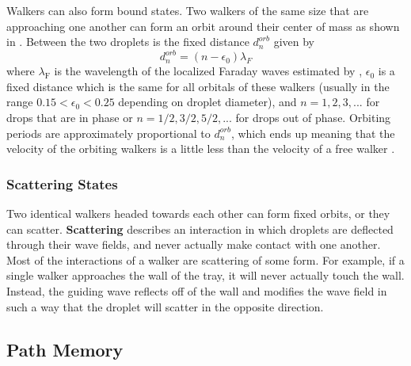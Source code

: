             Walkers can also form bound states. Two walkers of the same size that are approaching one another can form an orbit around their center of mass as shown in . Between the two droplets is the fixed distance $d_{n}^{orb}$ given by          
\begin{equation} \label{orbital}
d_{n}^{orb} = (n - \epsilon_0)\lambda_F
\end{equation}         
where $\lambda_\mathrm{F}$ is the wavelength of the localized Faraday waves estimated by , $\epsilon_0$ is a fixed distance which is the same for all orbitals of these walkers (usually in the range $0.15 < \epsilon_0 < 0.25$ depending on droplet diameter), and $n = 1,2,3,...$ for drops that are in phase or $n = 1/2, 3/2, 5/2,...$ for drops out of phase. Orbiting periods are approximately proportional to $d_{n}^{orb}$, which ends up meaning that the velocity of the orbiting walkers is a little less than the velocity of a free walker . 


            \subsubsection{Scattering States}
            Two identical walkers headed towards each other can form fixed orbits, or they can scatter. \textbf{Scattering} describes an interaction in which droplets are deflected through their wave fields, and never actually make contact with one another. Most of the interactions of a walker are scattering of some form. For example, if a single walker approaches the wall of the tray, it will never actually touch the wall. Instead, the guiding wave reflects off of the wall and modifies the wave field in such a way that the droplet will scatter in the opposite direction.           





 
            \subsection{Path Memory}
                        
